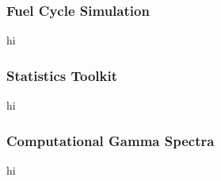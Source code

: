 
\begin{frame}
  \frametitle{Fuel Cycle Simulation}
  hi
\end{frame}

\begin{frame}
  \frametitle{Statistics Toolkit}
  hi
\end{frame}

\begin{frame}
  \frametitle{Computational Gamma Spectra}
  hi
\end{frame}
